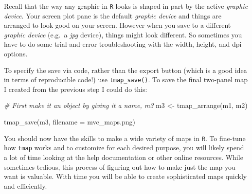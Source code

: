 \documentclass[
]{book}
\newenvironment{Shaded}{\begin{snugshade}}{\end{snugshade}}
\newcommand{\AttributeTok}[1]{\textcolor[rgb]{0.77,0.63,0.00}{#1}}
\newcommand{\CommentTok}[1]{\textcolor[rgb]{0.56,0.35,0.01}{\textit{#1}}}
\newcommand{\FunctionTok}[1]{\textcolor[rgb]{0.00,0.00,0.00}{#1}}
\newcommand{\NormalTok}[1]{#1}
\newcommand{\OtherTok}[1]{\textcolor[rgb]{0.56,0.35,0.01}{#1}}
\newcommand{\StringTok}[1]{\textcolor[rgb]{0.31,0.60,0.02}{#1}}
\begin{document}
Recall that the way any graphic in \texttt{R} looks is shaped in part by the active \emph{graphic device}. Your screen plot pane is the default \emph{graphic device} and things are arranged to look good on your screen. However when you save to a different \emph{graphic device} (e.g.~a \emph{jpg} device), things might look different. So sometimes you have to do some trial-and-error troubleshooting with the width, height, and dpi options.

To specify the save via code, rather than the export button (which is a good idea in terms of reproducible code!) use \texttt{tmap\_save()}. To save the final two-panel map I created from the previous step I could do this:

\begin{Shaded}
\begin{Highlighting}[]
\CommentTok{\# First make it an object by giving it a name, m3}
\NormalTok{m3 }\OtherTok{\textless{}{-}} \FunctionTok{tmap\_arrange}\NormalTok{(m1, m2)}

\FunctionTok{tmap\_save}\NormalTok{(m3, }\AttributeTok{filename =} \StringTok{\textquotesingle{}mvc\_maps.png\textquotesingle{}}\NormalTok{)}
\end{Highlighting}
\end{Shaded}

You should now have the skills to make a wide variety of maps in \texttt{R}. To fine-tune how \texttt{tmap} works and to customize for each desired purpose, you will likely spend a lot of time looking at the help documentation or other online resources. While sometimes tedious, this process of figuring out how to make just the map you want is valuable. With time you will be able to create sophisticated maps quickly and efficiently.

  
\end{document}
